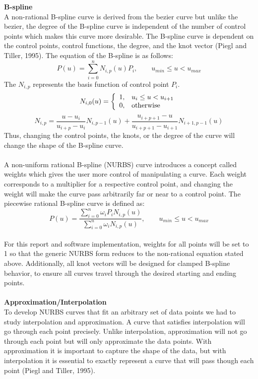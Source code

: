 \documentclass[11pt]{article}
\begin{document}
\textbf{\large{B-spline}}
\\
A non-rational B-spline curve is derived from the bezier curve but unlike the bezier, the degree of the B-spline curve is independent of the number of control points which makes this curve more desirable. The B-spline curve is dependent on the control points, control functions, the degree, and the knot vector (Piegl and Tiller, 1995). The equation of the B-spline is as follows:
$$P(u) = \sum^n_{i=0} N_{i,p}(u)P_i, \qquad u_{min}\leq u < u_{max}$$
The $N_{i,p}$ represents the basis function of control point $P_i$.
$$N_{i,0}(u) = \left\{
                 \begin{array}{ll}
                   1, & \hbox{$u_i \leq u < u_{i+1}$} \\
                   0, & \hbox{otherwise}
                 \end{array}
               \right.$$
$$ N_{i,p} = \frac{u-u_i}{u_{i+p}-u_i} N_{i,p-1}(u)+ \frac{u_{i+p+1}-u}{u_{i+p+1}-u_{i+1}} N_{i+1,p-1}(u)$$
Thus, changing the control points, the knots, or the degree of the curve will change the shape of the B-spline curve.
\\
\\
A non-uniform rational B-spline (NURBS) curve introduces a concept called weights which gives the user more control of manipulating a curve. Each weight corresponds to a multiplier for a respective control point, and changing the weight will make the curve pass arbitrarily far or near to a control point. The piecewise rational B-spline curve is defined as:
$$ P(u) = \frac{\sum^n_{i=0} \omega_i P_i N_{i,p}(u)}{\sum^n_{i=0} \omega_i N_{i,p}(u)}, \qquad u_{min} \leq u < u_{max} $$
\\
For this report and software implementation, weights for all points will be set to 1 so that the generic NURBS form reduces to the non-rational equation stated above. Additionally, all knot vectors will be designed for clamped B-spline behavior, to ensure all curves travel through the desired starting and ending points.
\\
\\
\textbf{\large{Approximation/Interpolation}}
\\
To develop NURBS curves that fit an arbitrary set of data points we had to study interpolation and approximation. A curve that satisfies interpolation will go through each point precisely. Unlike interpolation, approximation will not go through each point but will only approximate the data points. With approximation it is important to capture the shape of the data, but with interpolation it is essential to exactly represent a curve that will pass though each point (Piegl and Tiller, 1995).
\end{document}
